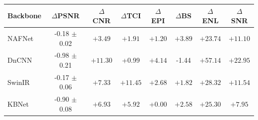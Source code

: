 \begin{tabular}{lccccccc}
\toprule
Backbone & $\Delta$PSNR & $\Delta$CNR & $\Delta$TCI & $\Delta$EPI & $\Delta$BS & $\Delta$ENL & $\Delta$SNR \\
\midrule
NAFNet & -0.18 $\pm$ 0.02 & $\mathbf{+3.49}$ & $\mathbf{+1.91}$ & $\mathbf{+1.20}$ & $\mathbf{+3.89}$ & $\mathbf{+23.74}$ & $\mathbf{+11.10}$ \\
DnCNN & -0.98 $\pm$ 0.21 & $\mathbf{+11.30}$ & +0.99 & $\mathbf{+4.14}$ & -1.44 & $\mathbf{+57.14}$ & $\mathbf{+22.95}$ \\
SwinIR & -0.17 $\pm$ 0.06 & $\mathbf{+7.33}$ & $\mathbf{+11.45}$ & $\mathbf{+2.68}$ & $\mathbf{+1.82}$ & $\mathbf{+28.32}$ & $\mathbf{+11.54}$ \\
KBNet & -0.90 $\pm$ 0.08 & $\mathbf{+6.93}$ & $\mathbf{+5.92}$ & +0.00 & $\mathbf{+2.58}$ & $\mathbf{+25.30}$ & $\mathbf{+7.95}$ \\
\bottomrule
\end{tabular}
